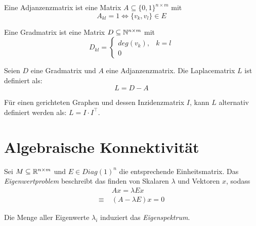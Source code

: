\begin{definition}[Adjanzenzmatrix]
    Eine Adjanzenzmatrix ist eine Matrix $ A \subseteq \{ 0, 1 \}^{n \times m} $ mit
    \begin{equation*}
        A_{kl} = 1 \Leftrightarrow \{ v_k, v_l \} \in E
    \end{equation*}
\end{definition}

\begin{definition}
    Eine Gradmatrix ist eine Matrix $ D \subseteq \mathbb{N}^{n \times m} $ mit
    \begin{equation*}
        D_{kl} = \begin{cases}
            deg(v_k), & k = l \\
            0
        \end{cases}
    \end{equation*}
\end{definition}

\begin{definition}[Laplacematrix]
    Seien $ D $ eine Gradmatrix und $ A $ eine Adjanzenzmatrix.
    Die Laplacematrix $ L $ ist definiert als:
    \begin{equation*}
        L = D - A
    \end{equation*}

    Für einen gerichteten Graphen und dessen Inzidenzmatrix $ I $, kann $ L $ alternativ definiert werden als: $ L = I \cdot I^\top $.
\end{definition}

\section{Algebraische Konnektivität}

\begin{definition}[Eigenwertproblem]
    Sei $ M \subseteq \mathbb{R}^{n \times m} $ und $ E \in Diag(1)^n $ die entsprechende Einheitsmatrix.
    Das \textit{Eigenwertproblem} beschreibt das finden von Skalaren $ \lambda $ und Vektoren $ x $, sodass
    \begin{align*}
        & Ax = \lambda Ex \\
        \equiv \; & (A - \lambda E) x = 0
    \end{align*}

    Die Menge aller Eigenwerte $ \lambda_i $ induziert das \textit{Eigenspektrum}.
\end{definition}

